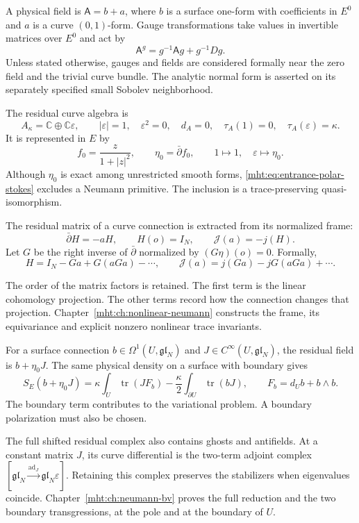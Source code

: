 A physical field is $\mathsf A=b+a$, where $b$ is a surface one-form
with coefficients in $E^0$ and $a$ is a curve $(0,1)$-form. Gauge
transformations take values in invertible matrices over $E^0$ and act by
\[
 \mathsf A^g=g^{-1}\mathsf Ag+g^{-1}Dg.
\]
Unless stated otherwise, gauges and fields are considered formally
near the zero field and the trivial curve bundle. The analytic
normal form is asserted on its separately specified small Sobolev
neighborhood.

The residual curve algebra is
\[
 A_\kappa=\mathbb C\oplus\mathbb C\varepsilon,
 \qquad |\varepsilon|=1,\quad\varepsilon^2=0,\quad
 d_A=0,\quad \tau_A(1)=0,\quad \tau_A(\varepsilon)=\kappa.
\]
It is represented in $E$ by
\[
 f_0=\frac{z}{1+|z|^2},\qquad
 \eta_0=\bar\partial f_0,
 \qquad 1\longmapsto1,\quad\varepsilon\longmapsto\eta_0.
\]
Although $\eta_0$ is exact among unrestricted smooth forms,
\eqref{mht:eq:entrance-polar-stokes} excludes a Neumann primitive.
The inclusion is a trace-preserving quasi-isomorphism.

The residual matrix of a curve connection is extracted from its
normalized frame:
\[
 \bar\partial H=-aH,\qquad H(o)=I_N,\qquad
 \mathcal J(a)=-j(H).
\]
Let $G$ be the right inverse of $\bar\partial$ normalized by
$(G\eta)(o)=0$. Formally,
\begin{equation}\label{mht:eq:entrance-nonlinear-residual}
 H=I_N-Ga+G(aGa)-\cdots,\qquad
\mathcal J(a)=j(Ga)-jG(aGa)+\cdots.
\end{equation}

The order of the matrix factors is retained. The first term is the
linear cohomology projection. The other terms record how the
connection changes that projection. Chapter~\ref{mht:ch:nonlinear-neumann}
constructs the frame, its equivariance and explicit nonzero nonlinear
trace invariants.

For a surface connection $b\in\Omega^1(U,\mathfrak{gl}_N)$ and
$J\in C^\infty(U,\mathfrak{gl}_N)$, the residual field is
$b+\eta_0J$. The same physical density on a surface with boundary gives
\begin{equation}\label{mht:eq:entrance-bf-action}
 S_E(b+\eta_0J)
   =\kappa\int_U\operatorname{tr}(JF_b)
        -\frac\kappa2\int_{\partial U}\operatorname{tr}(bJ),
 \qquad F_b=d_Ub+b\wedge b.
\end{equation}
The boundary term contributes to the variational problem. A boundary
polarization must also be chosen.

The full
shifted residual complex also contains ghosts and antifields. At a
constant matrix $J$, its curve differential is the two-term adjoint
complex $[\mathfrak{gl}_N\xrightarrow{\operatorname{ad}_J}
\mathfrak{gl}_N\varepsilon]$. Retaining this complex preserves the
stabilizers when eigenvalues coincide. Chapter~\ref{mht:ch:neumann-bv}
proves the full reduction and the two boundary transgressions, at the
pole and at the boundary of $U$.

